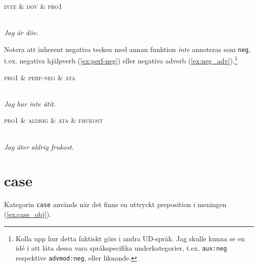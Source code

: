 \documentclass[11pt,a4paper]{article}
\begin{document}
\begin{example}
\label{ex:neg_noun}
\begin{dependency}[theme = simple]
   \begin{deptext}[column sep=1em]
      \textsc{inte} \& \textsc{döv} \& \textsc{pro1} \\
   \end{deptext}
\end{dependency}
\\
\textit{Jag är döv.}
\end{example}

\noindent Notera att inherent negativa tecken med annan funktion \textit{inte} annoteras som \texttt{neg}, t.ex. negativa hjälpverb (\ref{ex:perf-neg}) eller negativa adverb (\ref{ex:neg_adv}).\footnote{Kolla upp hur detta faktiskt görs i andra UD-språk. Jag skulle kunna se en idé i att låta dessa vara språkspecifika underkategorier, t.ex. \texttt{aux:neg} respektive \texttt{advmod:neg}, eller liknande.}

\begin{example}
\label{ex:perf-neg}
\begin{dependency}[theme = simple]
   \begin{deptext}[column sep=1em]
      \textsc{pro1} \& \textsc{perf-neg} \& \textsc{äta} \\
   \end{deptext}
\end{dependency}
\\
\textit{Jag har inte ätit.}
\end{example}

\begin{example}
\label{ex:neg_adv}
\begin{dependency}[theme = simple]
   \begin{deptext}[column sep=1em]
      \textsc{pro1} \& \textsc{aldrig} \& \textsc{äta} \& \textsc{frukost} \\
   \end{deptext}
\end{dependency}
\\
\textit{Jag äter aldrig frukost.}
\end{example}

\section{case}
Kategorin \texttt{case} används när det finns en uttryckt preposition i meningen (\ref{ex:case_obj}).
\end{document}
